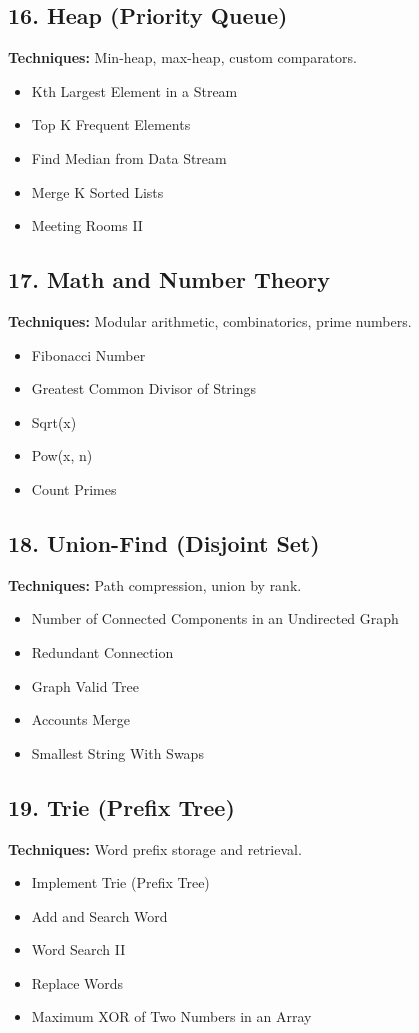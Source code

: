 \documentclass{article}
\begin{document}
\subsection*{16. Heap (Priority Queue)}
\textbf{Techniques:} Min-heap, max-heap, custom comparators.
\begin{itemize}[noitemsep]
    \item Kth Largest Element in a Stream
    \item Top K Frequent Elements
    \item Find Median from Data Stream
    \item Merge K Sorted Lists
    \item Meeting Rooms II
\end{itemize}

\subsection*{17. Math and Number Theory}
\textbf{Techniques:} Modular arithmetic, combinatorics, prime numbers.
\begin{itemize}[noitemsep]
    \item Fibonacci Number
    \item Greatest Common Divisor of Strings
    \item Sqrt(x)
    \item Pow(x, n)
    \item Count Primes
\end{itemize}

\subsection*{18. Union-Find (Disjoint Set)}
\textbf{Techniques:} Path compression, union by rank.
\begin{itemize}[noitemsep]
    \item Number of Connected Components in an Undirected Graph
    \item Redundant Connection
    \item Graph Valid Tree
    \item Accounts Merge
    \item Smallest String With Swaps
\end{itemize}

\subsection*{19. Trie (Prefix Tree)}
\textbf{Techniques:} Word prefix storage and retrieval.
\begin{itemize}[noitemsep]
    \item Implement Trie (Prefix Tree)
    \item Add and Search Word
    \item Word Search II
    \item Replace Words
    \item Maximum XOR of Two Numbers in an Array
\end{itemize}
\end{document}
